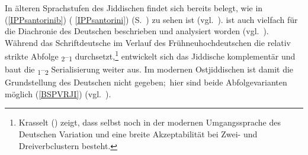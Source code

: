  In älteren Sprachstufen des Jiddischen findet sich bereits \hai{{\VR}} belegt, wie in (\ref{IPPsantorinib}) ( \ref{IPPsantorini}) (S.\, \pageref{IPPsantorini})  zu sehen ist (vgl.\, \citealt{Santorini1989,Santorini1992,Santorini1993b,Santorini1993a,Santorini1994,Santorini1995}). \hai{{\VR}} ist auch vielfach für die Diachronie des Deutschen beschrieben und analysiert worden (vgl.\, \citealt{Maurer1926,Haerd1981,Ebert1980,Ebert1981,Ebert1998,Agel2001,Ramers2005,Axel2007,Sapp2006,Sapp2011}). Während das Schriftdeutsche im Verlauf des Frühneuhochdeutschen die relativ strikte Abfolge \textsubscript{2}–\textsubscript{1} durchsetzt,\footnote{Krasselt (\citeyear{Krasselt2013}) zeigt, dass selbst noch in der modernen Umgangssprache des Deutschen Variation und eine breite Akzeptabilität bei Zwei- und Dreiverbclustern besteht.} entwickelt sich das Jiddische komplementär und baut die \textsubscript{1}–\textsubscript{2} Serialisierung weiter aus. Im modernen Ostjiddischen ist damit die Grundstellung des Deutschen nicht gegeben;\, hier sind beide Abfolgevarianten möglich (\ref{BSPVRJI}) (vgl.\, \citealt{Santorini1989,Santorini1992,Santorini1993b,Santorini1993a,Santorini1994,Santorini1995,BestenWalraven1986}). 
  
  
  

